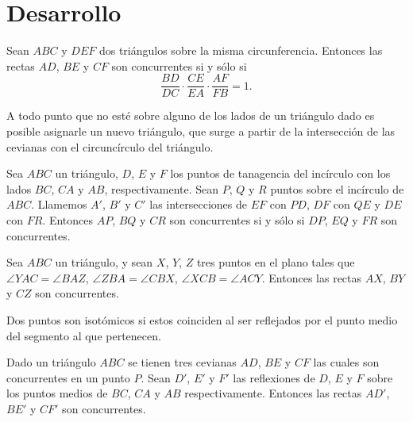 \section{Desarrollo}



\begin{section-theorem.tcb}
    Sean $ABC$ y $DEF$ dos triángulos sobre la misma circunferencia.
    Entonces las rectas $AD$, $BE$ y $CF$ son concurrentes si y sólo si
    \[\frac{BD}{DC} \cdot \frac{CE}{EA} \cdot \frac{AF}{FB} = 1.\]
\end{section-theorem.tcb}

\begin{section-definition.tcb}
    A todo punto que no esté sobre alguno de los lados de un triángulo dado es posible asignarle un nuevo triángulo, que surge a partir de la intersección de las cevianas con el circuncírculo del triángulo.
\end{section-definition.tcb}

\begin{section-theorem.tcb}
    Sea $ABC$ un triángulo, $D$, $E$ y $F$ los puntos de tanagencia del incírculo con los lados $BC$, $CA$ y $AB$, respectivamente.
    Sean $P$, $Q$ y $R$ puntos sobre el incírculo de $ABC$.
    Llamemos $A'$, $B'$ y $C'$ las intersecciones de $EF$ con $PD$, $DF$ con $QE$ y $DE$ con $FR$.
    Entonces $AP$, $BQ$ y $CR$ son concurrentes si y sólo si $DP$, $EQ$ y $FR$ son concurrentes.
\end{section-theorem.tcb}

\begin{section-theorem.tcb}
    Sea $ABC$ un triángulo, y sean $X$, $Y$, $Z$ tres puntos en el plano tales que $\angle YAC = \angle BAZ$, $\angle ZBA = \angle CBX$, $\angle XCB = \angle ACY$.
    Entonces las rectas $AX$, $BY$ y $CZ$ son concurrentes.
\end{section-theorem.tcb}

\begin{section-definition.tcb}
    Dos puntos son isotómicos si estos coinciden al ser reflejados por el punto medio del segmento al que pertenecen.
\end{section-definition.tcb}

\begin{section-definition.tcb}
    Dado un triángulo $ABC$ se tienen tres cevianas $AD$, $BE$ y $CF$ las cuales son concurrentes en un punto $P$.
    Sean $D'$, $E'$ y $F'$ las reflexiones de $D$, $E$ y $F$ sobre los puntos medios de $BC$, $CA$ y $AB$ respectivamente.
    Entonces las rectas $AD'$, $BE'$ y $CF'$ son concurrentes.
\end{section-definition.tcb}

